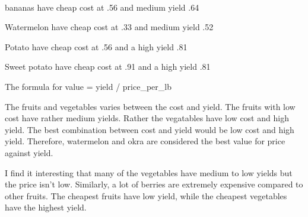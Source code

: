 \documentclass[11pt]{article}
\begin{document}
    \begin{center}
    \end{center}
    { \hspace*{\fill} \\}
    
    bananas have cheap cost at .56 and medium yield .64

Watermelon have cheap cost at .33 and medium yield .52

Potato have cheap cost at .56 and a high yield .81

Sweet potato have cheap cost at .91 and a high yield .81

The formula for value = yield / price\_per\_lb

The fruits and vegetables varies between the cost and yield. The fruits
with low cost have rather medium yields. Rather the vegatables have low
cost and high yield. The best combination between cost and yield would
be low cost and high yield. Therefore, watermelon and okra are
considered the best value for price against yield.

I find it interesting that many of the vegetables have medium to low
yields but the price isn't low. Similarly, a lot of berries are
extremely expensive compared to other fruits. The cheapest fruits have
low yield, while the cheapest vegetables have the highest yield.


    
    
    
    
\end{document}
